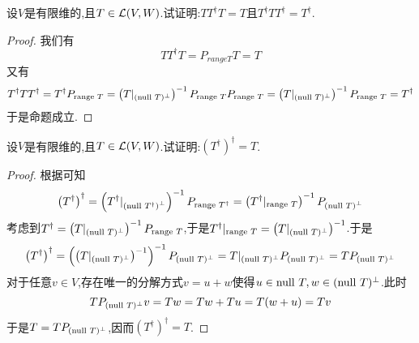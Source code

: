 \documentclass{ctexart}
\begin{document}
\begin{problem}[22.]
    设$V$是有限维的,且$T\in\mathcal{L}(V,W)$.试证明:$TT^{\dagger}T=T$且$T^{\dagger}TT^{\dagger}=T^\dagger$.
\end{problem}
\begin{proof}
    我们有
    \[TT^{\dagger}T=P_{range T}T=T\]
    又有
    \[T^{\dagger}TT^{\dagger}=T^{\dagger}P_{\text{range } T}=\left(T|_{(\text{null } T)^\bot}\right)^{-1}P_{\text{range } T}P_{\text{range } T}=\left(T|_{(\text{null } T)^\bot}\right)^{-1}P_{\text{range } T}=T^\dagger\]
    于是命题成立.
\end{proof}
\begin{problem}[23.]
    设$V$是有限维的,且$T\in\mathcal{L}(V,W)$.试证明:$\left(T^\dagger\right)^\dagger=T$.
\end{problem}
\begin{proof}
    根据可知
    \[\left(T^\dagger\right)^\dagger
    =\left(T^\dagger|_{\left(\text{null } T^\dagger\right)^\bot}\right)^{-1}P_{\text{range } T^\dagger}
    =\left(T^\dagger|_{\text{range } T}\right)^{-1}P_{\left(\text{null } T\right)^\bot}\]
    考虑到$T^\dagger=\left(T|_{(\text{null } T)^\bot}\right)^{-1}P_{\text{range } T}$,于是$T^\dagger|_{\text{range } T}=\left(T|_{(\text{null } T)^\bot}\right)^{-1}$.于是
    \[\left(T^\dagger\right)^\dagger
    =\left(\left(T|_{(\text{null } T)^\bot}\right)^{-1}\right)^{-1}P_{(\text{null } T)^\bot}
    =T|_{(\text{null } T)^\bot}P_{(\text{null } T)^\bot}
    =TP_{(\text{null } T)^\bot}\]
    对于任意$v\in V$,存在唯一的分解方式$v=u+w$使得$u\in\text{null } T,w\in(\text{null } T)^\bot$.此时
    \[TP_{(\text{null } T)^\bot}v=Tw=Tw+Tu=T(w+u)=Tv\]
    于是$T=TP_{(\text{null } T)^\bot}$,因而$\left(T^\dagger\right)^\dagger=T$.
\end{proof}
\end{document}
